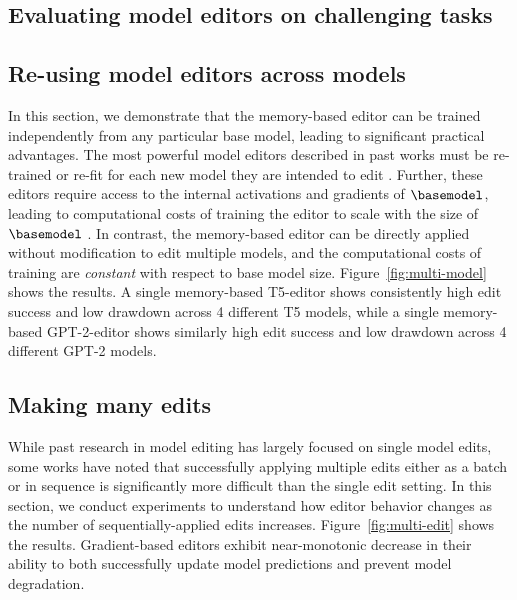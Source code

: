 

\subsection{Evaluating model editors on challenging tasks}

\subsection{Re-using model editors across models}

In this section, we demonstrate that the memory-based editor can be trained independently from any particular base model, leading to significant practical advantages. The most powerful model editors described in past works must be re-trained or re-fit for each new model they are intended to edit \citep{Sinitsin2020Editable,Cao2021EditingFK,mitchell2021fast,anon2021moving}. Further, these editors require access to the internal activations and gradients of $\basemodel$, leading to computational costs of training the editor to scale with the size of $\basemodel$ \citep{mitchell2021fast}. In contrast, the memory-based editor can be directly applied without modification to edit multiple models, and the computational costs of training are \textit{constant} with respect to base model size. Figure~\ref{fig:multi-model} shows the results. A single memory-based T5-editor shows consistently high edit success and low drawdown across 4 different T5 models, while a single memory-based GPT-2-editor shows similarly high edit success and low drawdown across 4 different GPT-2 models.


\subsection{Making many edits}

While past research in model editing has largely focused on single model edits, some works have noted that successfully applying multiple edits either as a batch \citep{mitchell2021fast} or in sequence \citep{hase2021language} is significantly more difficult than the single edit setting. In this section, we conduct experiments to understand how editor behavior changes as the number of sequentially-applied edits increases. Figure~\ref{fig:multi-edit} shows the results. Gradient-based editors exhibit near-monotonic decrease in their ability to both successfully update model predictions and prevent model degradation.

